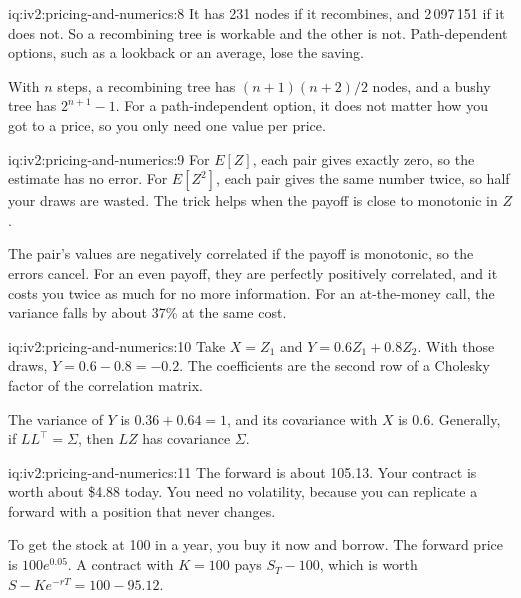 \begin{solution}{iq:iv2:pricing-and-numerics:8}
It has 231 nodes if it recombines, and 2\,097\,151 if it does not. So a recombining tree is workable and the other is not. Path-dependent options, such as a lookback or an average, lose the saving.

With $n$ steps, a recombining tree has $(n + 1)(n + 2)/2$ nodes, and a bushy tree has $2^{n+1} - 1$. For a path-independent option, it does not matter how you got to a price, so you only need one value per price.

\end{solution}

\begin{solution}{iq:iv2:pricing-and-numerics:9}
For $E[Z]$, each pair gives exactly zero, so the estimate has no error. For $E[Z^2]$, each pair gives the same number twice, so half your draws are wasted. The trick helps when the payoff is close to monotonic in $Z$.

The pair's values are negatively correlated if the payoff is monotonic, so the errors cancel. For an even payoff, they are perfectly positively correlated, and it costs you twice as much for no more information. For an at-the-money call, the variance falls by about 37\% at the same cost.

\end{solution}

\begin{solution}{iq:iv2:pricing-and-numerics:10}
Take $X = Z_1$ and $Y = 0.6Z_1 + 0.8Z_2$. With those draws, $Y = 0.6 - 0.8 = -0.2$. The coefficients are the second row of a Cholesky factor of the correlation matrix.

The variance of $Y$ is $0.36 + 0.64 = 1$, and its covariance with $X$ is 0.6. Generally, if $LL^\top = \Sigma$, then $LZ$ has covariance $\Sigma$.

\end{solution}

\begin{solution}{iq:iv2:pricing-and-numerics:11}
The forward is about 105.13. Your contract is worth about \$4.88 today. You need no volatility, because you can replicate a forward with a position that never changes.

To get the stock at 100 in a year, you buy it now and borrow. The forward price is $100e^{0.05}$. A contract with $K = 100$ pays $S_T - 100$, which is worth $S - Ke^{-rT} = 100 - 95.12$.

\end{solution}

